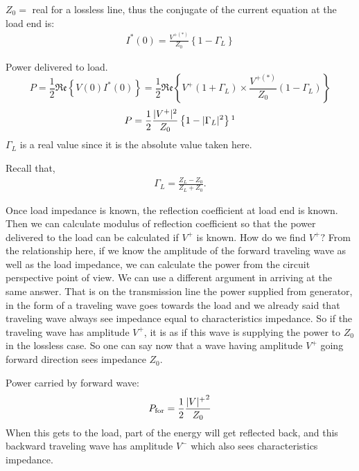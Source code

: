 $Z_0= $ real for a lossless line, thus the conjugate of the current equation at the load end is:
\begin{align*}
I^\ast (0) =\frac{V^{+ (\ast )}}{Z_0}\left\lbrace 1 -\Gamma_L \right\rbrace
\end{align*}

Power delivered to load.
\begin{dmath*}
P = \frac{1}{2}\mathfrak{Re}\left\lbrace V(0) I^\ast(0) \right\rbrace= \frac{1}{2}\mathfrak{Re}\left\lbrace V^+(1+\Gamma_L) \times\frac{V^{+(\ast)}}{Z_0} (1-\Gamma_L)\right\rbrace
\end{dmath*}
\begin{equation}
P = \frac{1}{2} \frac{|V^+|^2}{Z_0} \left\lbrace 1 -|\Gamma_L|^2 \right\rbrace\footnotemark
\end{equation}
$\Gamma_L$ is a real value since it is the absolute value taken here.

Recall that,
\begin{align*}\Gamma_L = \frac{ Z_L -Z_0 }{ Z_L + Z_0 }.
\end{align*}

Once load impedance is known, the reflection coefficient at load end is known. Then we can calculate modulus of reflection coefficient so that the power delivered to the load can be calculated if $V^+$ is known. How do we find $V^+ ? $ From the relationship here, if we know the amplitude of the forward traveling wave as well as the load impedance, we can calculate the power from the circuit perspective point of view. We can use a different argument in arriving at the same answer. That is on the transmission line the power supplied from generator, in the form of a traveling wave goes towards the load and we already said that traveling wave always see impedance equal to characteristics impedance. So if the traveling wave has amplitude $V^+$, it is as if this wave is supplying the power to $Z_0$ in the lossless case. So one can say now that  a wave having amplitude $V^+$ going forward direction sees impedance $Z_0$.

Power carried by forward wave:  
\begin{align*}
P_{\textnormal{for}} = \frac{1}{2} \frac{{|V|^+}^2}{Z_0}
\end{align*}
When this gets to the load, part of the energy will get reflected back, and this backward traveling wave has amplitude $V^-$ which also sees characteristics impedance.

